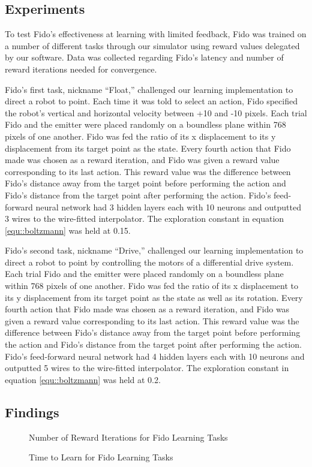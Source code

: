 \subsection{Experiments}

To test Fido's effectiveness at learning with limited feedback, Fido was trained on a number of different tasks through our simulator using reward values delegated by our software. Data was collected regarding Fido's latency and number of reward iterations needed for convergence.

Fido's first task, nickname ``Float,'' challenged our learning implementation to direct a robot to point. Each time it was told to select an action, Fido specified the robot's vertical and horizontal velocity between +10 and -10 pixels. Each trial Fido and the emitter were placed randomly on a boundless plane within 768 pixels of one another. Fido was fed the ratio of its x displacement to its y displacement from its target point as the state. Every fourth action that Fido made was chosen as a reward iteration, and Fido was given a reward value corresponding to its last action. This reward value was the difference between Fido's distance away from the target point before performing the action and Fido's distance from the target point after performing the action. Fido's feed-forward neural network had 3 hidden layers each with 10 neurons and outputted 3 wires to the wire-fitted interpolator. The exploration constant in equation \ref{equ::boltzmann} was held at 0.15.

Fido's second task, nickname ``Drive,'' challenged our learning implementation to direct a robot to point by controlling the motors of a differential drive system. Each trial Fido and the emitter were placed randomly on a boundless plane within 768 pixels of one another. Fido was fed the ratio of its x displacement to its y displacement from its target point as the state as well as its rotation. Every fourth action that Fido made was chosen as a reward iteration, and Fido was given a reward value corresponding to its last action. This reward value was the difference between Fido's distance away from the target point before performing the action and Fido's distance from the target point after performing the action. Fido's feed-forward neural network had 4 hidden layers each with 10 neurons and outputted 5 wires to the wire-fitted interpolator. The exploration constant in equation \ref{equ::boltzmann} was held at 0.2.


\subsection{Findings}

\begin{figure}[ht]
	\centering
	
	\caption{Number of Reward Iterations for Fido Learning Tasks}
\end{figure}

\begin{figure}[ht]
	\centering
	
	\caption{Time to Learn for Fido Learning Tasks}
\end{figure}
